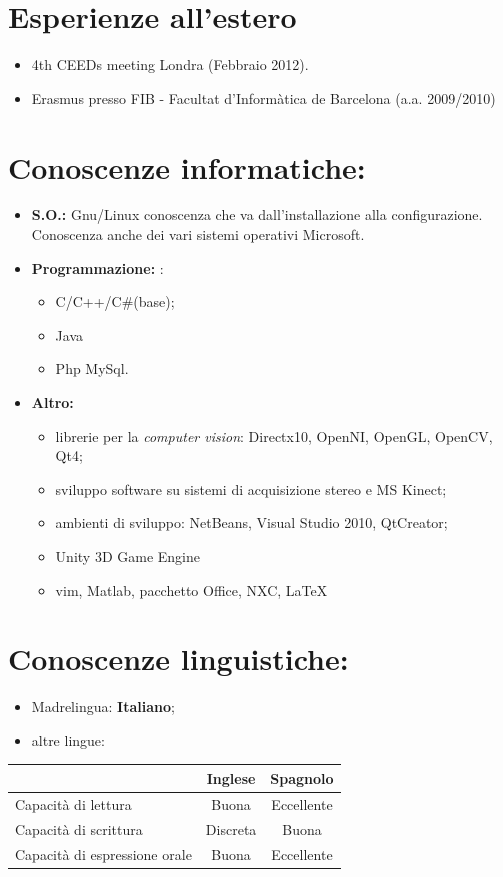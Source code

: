 \documentclass[pdftex,a4paper,10pt,twoside,titlepage,italian]{article}
\begin{document}
\section*{Esperienze all'estero}
\begin{itemize}
	\item 4th CEEDs meeting Londra (Febbraio 2012).
	\item Erasmus presso FIB - Facultat d’Informàtica de Barcelona (a.a. 2009/2010)
\end{itemize}

\section*{Conoscenze informatiche:}
\begin{itemize}
	\item \textbf{S.O.:} Gnu/Linux conoscenza 	che va dall'installazione alla configurazione. Conoscenza anche dei vari 
	sistemi operativi Microsoft.
	\item \textbf{Programmazione: }:
	\begin{itemize}
	\item C/C++/C\#(base);
	\item Java
	\item Php MySql.
	\end{itemize}
	\item \textbf{Altro: }
	\begin{itemize}
	\item librerie per la {\itshape computer vision}: Directx10, OpenNI, OpenGL, OpenCV, Qt4;
	\item sviluppo software su sistemi di acquisizione stereo e MS Kinect;
	\item ambienti di sviluppo: NetBeans, Visual Studio 2010, QtCreator;
	\item Unity 3D Game Engine
	\item vim, Matlab, pacchetto Office, NXC, \LaTeX
	\end{itemize}
\end{itemize}
\section*{Conoscenze linguistiche:}
\begin{itemize}
	\item Madrelingua: \textbf{Italiano};
	\item altre lingue:
\end{itemize}
\begin{center}
	\begin{tabular}{|l|c|c|}
	\hline
	&\textbf{Inglese} & \textbf{Spagnolo}\\
	\hline
	Capacità di lettura & Buona & Eccellente\\
	\hline
	Capacità di scrittura & Discreta & Buona \\
	\hline
	Capacità di espressione orale & Buona & Eccellente \\
	\hline
	\end{tabular}
\end{center}
\end{document}
